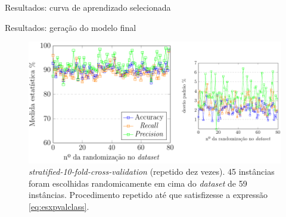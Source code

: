 \documentclass[brazil]{beamer}
\begin{document}
\begin{frame}{Resultados: curva de aprendizado selecionada}
   \begin{table}[!htp]
      \centering
      \caption{\justifying Valores das curvas ``ma x sl'' da Figura \ref{fig:accuracy_precision_recall} a partir do \textit{dataset} com 40 instâncias. A (\textit{Accuracy}), P (\textit{Precision}, R (\textit{Recall}), DP (Desvio Padrão), i (instâncias). Os valores A, P, R e DV estão em \%.}
   \end{table}


\end{frame}

\begin{frame}{Resultados: geração do modelo final}
   \begin{figure}[!htb] \centering 
     \centering
     \includegraphics[width=1.0\columnwidth]{slide/apr45_dev} 
     \caption{\justifying \textit{stratified-10-fold-cross-validation} (repetido dez vezes). 45 instâncias foram escolhidas randomicamente em cima do \textit{dataset} de 59 instâncias. Procedimento repetido até que satisfizesse a expressão \ref{eq:esxpvalclass}. } 
     \label{fig:apr45_dev}
   \end{figure}
\end{frame}
\end{document}
